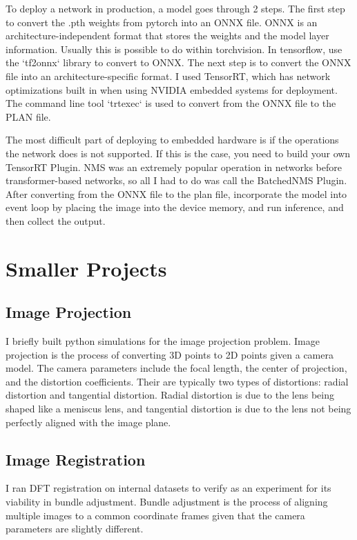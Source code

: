 \documentclass[12pt]{article}
\begin{document}
To deploy a network in production, a model goes through 2 steps. The first step to convert the .pth weights from pytorch into an ONNX file. \cite{metaTorchonnxDocumentation} ONNX is an architecture-independent format that stores the weights and the model layer information. Usually this is possible to do within torchvision. In tensorflow, use the `tf2onnx` library to convert to ONNX. \cite{Tensorflowonnx2024} The next step is to convert the ONNX file into an architecture-specific format. I used TensorRT, which has network optimizations built in when using NVIDIA embedded systems for deployment. \cite{NVIDIATensorRT2024} The command line tool `trtexec` is used to convert from the ONNX file to the PLAN file.

The most difficult part of deploying to embedded hardware is if the operations the network does is not supported. If this is the case, you need to build your own TensorRT Plugin. NMS was an extremely popular operation in networks before transformer-based networks, so all I had to do was call the BatchedNMS Plugin. \cite{TensorRTPluginBatchedNMSPlugin} After converting from the ONNX file to the plan file, incorporate the model into event loop by placing the image into the device memory, and run inference, and then collect the output.

\section{Smaller Projects}
\subsection{Image Projection}
I briefly built python simulations for the image projection problem. Image projection is the process of converting 3D points to 2D points given a camera model. The camera parameters include the focal length, the center of projection, and the distortion coefficients. Their are typically two types of distortions: radial distortion and tangential distortion. Radial distortion is due to the lens being shaped like a meniscus lens, and tangential distortion is due to the lens not being perfectly aligned with the image plane. 

\subsection{Image Registration}
I ran DFT registration on internal datasets to verify as an experiment for its viability in bundle adjustment. Bundle adjustment is the process of aligning multiple images to a common coordinate frames given that the camera parameters are slightly different.

\printbibliography
\end{document}
